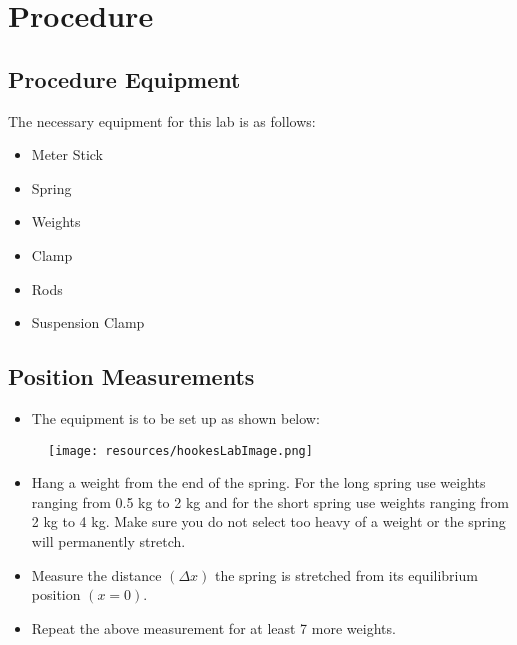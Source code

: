 \chapter{Procedure}

\section{Procedure Equipment}

The necessary equipment for this lab is as follows: 
\begin{itemize}
  \item Meter Stick
  \item Spring
  \item Weights 
  \item Clamp
  \item Rods
  \item Suspension Clamp
\end{itemize}

\section{Position Measurements}

\begin{itemize}
  \item The equipment is to be set up as shown below:
\end{itemize}

\begin{figure}[h!]
  \centerline{\texttt{[image: resources/hookesLabImage.png]}}
\end{figure}

\begin{itemize}
  \item Hang a weight from the end of the spring. For the long spring use weights ranging
        from 0.5 kg to 2 kg and for the short spring use weights ranging from 2 kg to 4 
        kg. Make sure you do not select too heavy of a weight or the spring will 
        permanently stretch.
  \item Measure the distance $(\Delta x)$ the spring is stretched from its equilibrium
        position $(x = 0)$.
  \item Repeat the above measurement for at least 7 more weights.
\end{itemize}
\restoregeometry